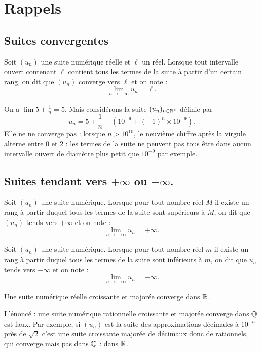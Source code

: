 \documentclass[a4paper,11pt,DIV14,BCOR0mm]{scrartcl}
\begin{document}
\section{Rappels}

\subsection{Suites convergentes}
\begin{definition}
 Soit $(u_n)$ une suite numérique réelle et $\ell$ un réel. Lorsque tout intervalle ouvert contenant $\ell$
contient tous les termes de la suite à partir d'un certain rang, on dit que $(u_n)$ converge vers $\ell$ et
on note :
\[
 \lim_{n\to+\infty}u_n=\ell.
\]
\end{definition}
\begin{exemple}
 On a $
 \lim 5+\frac{1}{n}=5.
$
Mais considérons la suite $(u_n)_{n\in\mathbb{N}^*}$ définie par \[
 u_n=5+\frac{1}{n}+(10^{-9}+(-1)^n\times 10^{-9}).
\]
Elle ne ne converge pas : lorsque $n> 10^{10}$, le neuvième chiffre après la virgule alterne entre
0 et 2 : les termes de la suite ne peuvent pas tous être dans aucun intervalle ouvert
de diamètre plus petit que $10^{-9}$ par exemple.
\end{exemple}


\subsection{Suites tendant vers $+\infty$ ou $-\infty$.}
\begin{definition}
 Soit $(u_n)$ une suite numérique. Lorsque pour tout nombre réel $M$ il existe un rang à partir duquel 
tous les termes de la suite sont supérieurs
à $M$, on dit que $(u_n)$ tends vers $+\infty$ et on note :
\[
 \lim_{n\to+\infty}u_n=+\infty.
\]
\end{definition}

\begin{definition}
 Soit $(u_n)$ une suite numérique. Lorsque pour tout nombre réel $m$ il existe un rang à 
partir duquel tous les termes de la suite sont inférieurs
à $m$, on dit que $u_n$ tends vers $-\infty$ et on note :
\[
 \lim_{n\to+\infty}u_n=-\infty.
\]
\end{definition}

\begin{theoreme}
Une suite numérique réelle croissante et majorée converge dans $\mathbb{R}$.
\end{theoreme}
\begin{remarque}
 L'énoncé : \og une suite numérique rationnelle croissante et majorée converge dans $\mathbb{Q}$\fg{} est
faux. Par exemple, si $(u_n)$ est la suite des approximations décimales à $10^{-n}$ près de
$\sqrt{2}$ c'est une suite croissante majorée de décimaux donc de rationnels, qui converge mais pas
dans $\mathbb{Q}$ : dans $\mathbb{R}$.
\end{remarque}
\end{document}
